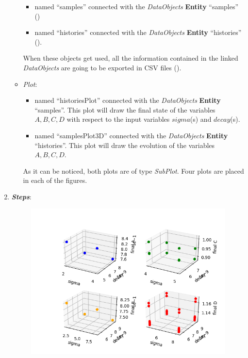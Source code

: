 \begin{enumerate}
\begin{itemize}
\begin{itemize}
       \item named ``samples'' connected with the \textit{DataObjects} \textbf{Entity} ``samples''
                ()
       \item named ``histories'' connected with the \textit{DataObjects} \textbf{Entity} ``histories'' ().
     \end{itemize}
      When these objects get used, all the information contained in the
      linked  \textit{DataObjects} are going
    to be exported in CSV files ().
    \item \textit{Plot}:
    \begin{itemize}
      \item named ``historiesPlot'' connected with the  \textit{DataObjects}
      \textbf{Entity} ``samples''.  This plot will draw the final state of the
      variables $A,B,C,D$ with respect to the input variables $sigma$(s)
      and $decay$(s).
      \item named ``samplesPlot3D'' connected with the
      \textit{DataObjects} \textbf{Entity} ``histories''. This plot will draw the
      evolution of the variables $A,B,C,D$.
    \end{itemize}
     As it can be noticed, both plots are of type \textit{SubPlot}. Four plots
     are placed in each of the figures.
  \end{itemize}
   \item \textbf{\textit{Steps}}:
 \begin{figure}[h!]
  \centering
  \includegraphics[scale=0.7]{../../tests/framework/user_guide/ForwardSamplingStrategies/gold/RunDir/Grid/1-samplesPlot3D_scatter-scatter-scatter-scatter.png}

\end{figure}
\end{enumerate}
